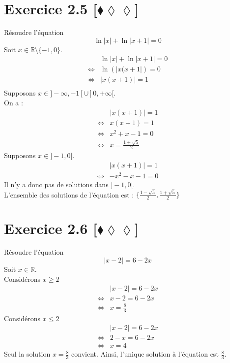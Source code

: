 \documentclass[10pt]{article}
\begin{document}
\section*{Exercice 2.5 [$\blacklozenge\lozenge\lozenge$]}
\begin{tcolorbox}[enhanced, width=6in, center, size=fbox, fontupper=\large, drop shadow southwest]
    Résoudre l'équation
    \begin{equation*}
        \ln|x|+\ln|x+1|=0
    \end{equation*}
    Soit $x\in\mathbb{R}\setminus\{-1,0\}$.
    \begin{align*}
        &\ln|x|+\ln|x+1|=0\\
        \iff&\ln\left(|x(x+1|\right)=0\\
        \iff&|x(x+1)|=1\\
    \end{align*}
    Supposons $x\in]-\infty,-1[\cup]0,+\infty[$.\\
    On a :
    \begin{align*}
        &|x(x+1)|=1\\
        \iff&x(x+1)=1\\
        \iff&x^2+x-1=0\\
        \iff&x=\frac{1\pm\sqrt{5}}{2}
    \end{align*}
    Supposons $x\in]-1,0[$.
    \begin{align*}
        &|x(x+1)|=1\\
        \iff&-x^2-x-1=0
    \end{align*}
    Il n'y a donc pas de solutions dans $]-1,0[$.\\
    L'ensemble des solutions de l'équation est : $\{\frac{1-\sqrt{5}}{2},\frac{1+\sqrt{5}}{2}\}$
\end{tcolorbox}

\section*{Exercice 2.6 [$\blacklozenge\lozenge\lozenge$]}
\begin{tcolorbox}[enhanced, width=6in, center, size=fbox, fontupper=\large, drop shadow southwest]
    Résoudre l'équation
    \begin{equation*}
        |x-2|=6-2x
    \end{equation*}
    Soit $x\in\mathbb{R}$.\\
    Considérons $x\geq2$
    \begin{align*}
        &|x-2|=6-2x\\
        \iff&x-2=6-2x\\
        \iff&x=\frac{8}{3}
    \end{align*}
    Considérons $x\leq2$
    \begin{align*}
        &|x-2|=6-2x\\
        \iff&2-x=6-2x\\
        \iff&x=4
    \end{align*}
    Seul la solution $x=\frac{8}{3}$ convient.
    Ainsi, l'unique solution à l'équation est $\frac{8}{3}$.
\end{tcolorbox}
\end{document}
